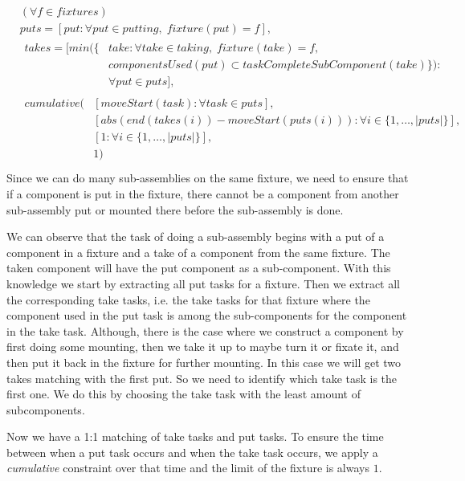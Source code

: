  \begin{equation}
 \begin{aligned}\label{eq:100}
 &(\forall f \in fixtures) \\
 &puts = [put : \forall put \in putting, \; fixture(put) = f], \\
 &\begin{aligned}
 takes = [min(\{&take : \forall take \in taking, \; fixture(take) = f,\\ &componentsUsed(put) \subset taskCompleteSubComponent(take)\}) : \\
 &\forall put \in puts], 
 \end{aligned}\\
 &\begin{aligned}
 cumulative(&[moveStart(task) : \forall task \in puts], \\ &[abs(end(takes(i))-moveStart(puts(i))) : \forall i \in \{1 , \ldots , |puts|\}], \\
 &[1 : \forall i \in \{1 , \ldots , |puts|\}],\\
 &1)
 \end{aligned}\\
 \end{aligned}
 \end{equation}
 Since we can do many sub-assemblies on the same fixture, we need to ensure that if a component is put in the fixture, there cannot be a component from another sub-assembly put or mounted there before the sub-assembly is done.
 
 We can observe that the task of doing a sub-assembly begins with a put of a component in a fixture and a take of a component from the same fixture. The taken component will have the put component as a sub-component. With this knowledge we start by extracting all put tasks for a fixture. Then we extract all the corresponding take tasks, i.e. the take tasks for that fixture where the component used in the put task is among the sub-components for the component in the take task. Although, there is the case where we construct a component by first doing some mounting, then we take it up to maybe turn it or fixate it, and then put it back in the fixture for further mounting. In this case we will get two takes matching with the first put. So we need to identify which take task is the first one. We do this by choosing the take task with the least amount of subcomponents.
 
 Now we have a 1:1 matching of take tasks and put tasks. To ensure the time between when a put task occurs and when the take task occurs, we apply a \emph{cumulative} constraint over that time and the limit of the fixture is always $1$.
 
